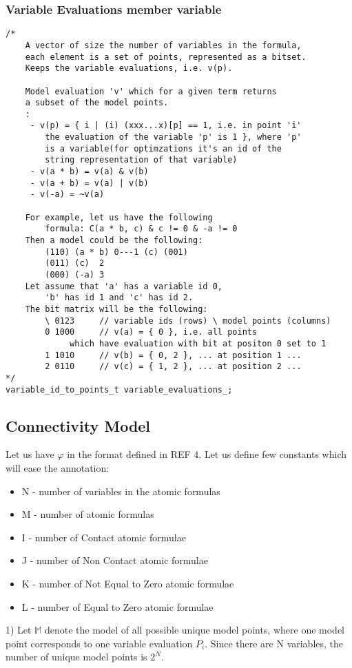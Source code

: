 \documentclass{article}
\begin{document}
		\subsubsection*{Variable Evaluations member variable}
			\begin{lstlisting}
/*
    A vector of size the number of variables in the formula, 
    each element is a set of points, represented as a bitset.
    Keeps the variable evaluations, i.e. v(p).

    Model evaluation 'v' which for a given term returns 
    a subset of the model points.
    :
     - v(p) = { i | (i) (xxx...x)[p] == 1, i.e. in point 'i' 
        the evaluation of the variable 'p' is 1 }, where 'p'
        is a variable(for optimzations it's an id of the 
        string representation of that variable)
     - v(a * b) = v(a) & v(b)
     - v(a + b) = v(a) | v(b)
     - v(-a) = ~v(a)

    For example, let us have the following 
        formula: C(a * b, c) & c != 0 & -a != 0
    Then a model could be the following:
        (110) (a * b) 0---1 (c) (001)
        (011) (c)  2
        (000) (-a) 3
    Let assume that 'a' has a variable id 0, 
        'b' has id 1 and 'c' has id 2.
    The bit matrix will be the following:
        \ 0123     // variable ids (rows) \ model points (columns)
        0 1000     // v(a) = { 0 }, i.e. all points 
             which have evaluation with bit at positon 0 set to 1
        1 1010     // v(b) = { 0, 2 }, ... at position 1 ...
        2 0110     // v(c) = { 1, 2 }, ... at position 2 ...
*/
variable_id_to_points_t variable_evaluations_;
			\end{lstlisting}

	\subsection{Connectivity Model}
		Let us have $\varphi$ in the format defined in REF 4. %
		Let us define few constants which will ease the annotation:
		\begin{itemize}
			\item N - number of variables in the atomic formulas
			\item M - number of atomic formulas
			\item I - number of Contact atomic formulae
			\item J - number of Non Contact atomic formulae
			\item K - number of Not Equal to Zero atomic formulae
			\item L - number of Equal to Zero atomic formulae
		\end{itemize}
		1) Let $\mathbb{M}$ denote the model of all possible unique model points, where one model point corresponds to 
			one variable evaluation $P_i$. 
			\newline
			Since there are N variables, the number of unique model points is $2^N$.
			\newline
\end{document}
